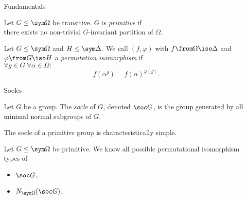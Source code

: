 \begin{frame}{Fundamentals}
    \begin{defn}
        Let $G \leq \sym \Omega$ be transitive.
        $G$ is \emph{primitive} if
        \\
        there exists no non-trivial
        $G$-invariant partition of $\Omega$.
    \end{defn}
    \pause

    \begin{defn}
        Let $G \leq \sym \Omega$ and $H \leq \sym \Delta$.
        We call $(f, \varphi)$ with
        $f \from \Omega \iso \Delta$
        and
        $\varphi \from G \iso H$
        a \emph{permutation isomorphism}
        if
        \\
        \pause
        $\forall g \in G ~ \forall \alpha \in \Omega :$
        \[
            f(\alpha ^ g) = f(\alpha) ^ {\varphi(g)}.
        \]
    \end{defn}
\end{frame}


\begin{frame}{Socles}
    \begin{defn}
        Let $G$ be a group. The \emph{socle} of $G$, denoted $\soc G$,
        is the group generated by all minimal normal subgroups of $G$.
    \end{defn}
    \pause

    \begin{thm}
        The socle of a primitive group is characteristically simple.
    \end{thm}
    \pause

    \begin{thm}
        Let $G \leq \sym \Omega$ be primitive.
        We know all possible permutational isomorphism types of
        \pause
        \vspace{-0.5em}
        \begin{itemize}
            \item
            $\soc G$,
            \pause
            \item
            $N_{\sym \Omega}(\soc G)$.
        \end{itemize}
    \end{thm}
\end{frame}


